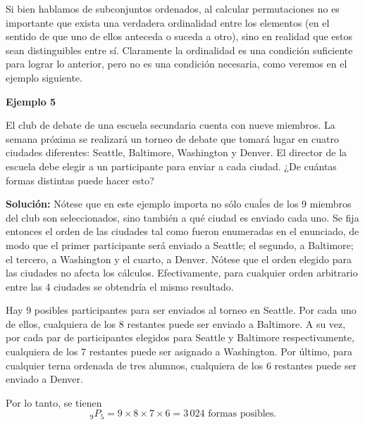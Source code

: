 \documentclass[
  letterpaper,
  DIV=11,
  numbers=noendperiod]{scrreprt}
\begin{document}
\begin{tcolorbox}[enhanced jigsaw, opacitybacktitle=0.6, breakable, toptitle=1mm, toprule=.15mm, colback=white, coltitle=black, leftrule=.75mm, colframe=quarto-callout-warning-color-frame, left=2mm, opacityback=0, bottomrule=.15mm, arc=.35mm, colbacktitle=quarto-callout-warning-color!10!white, bottomtitle=1mm, titlerule=0mm, title=\textcolor{quarto-callout-warning-color}{\faExclamationTriangle}\hspace{0.5em}{Advertencia}, rightrule=.15mm]

Si bien hablamos de subconjuntos ordenados, al calcular permutaciones no
es importante que exista una verdadera ordinalidad entre los elementos
(en el sentido de que uno de ellos anteceda o suceda a otro), sino en
realidad que estos sean distinguibles entre sí. Claramente la
ordinalidad es una condición suficiente para lograr lo anterior, pero no
es una condición necesaria, como veremos en el ejemplo siguiente.

\end{tcolorbox}

\begin{examplebox}

\begin{center}
\textbf{Ejemplo 5}

\end{center}

El club de debate de una escuela secundaria cuenta con nueve miembros.
La semana próxima se realizará un torneo de debate que tomará lugar en
cuatro ciudades diferentes: Seattle, Baltimore, Washington y Denver. El
director de la escuela debe elegir a un participante para enviar a cada
ciudad. ¿De cuántas formas distintas puede hacer esto?

\textbf{Solución:} Nótese que en este ejemplo importa no sólo cuaĺes de
los 9 miembros del club son seleccionados, sino también a qué ciudad es
enviado cada uno. Se fija entonces el orden de las ciudades tal como
fueron enumeradas en el enunciado, de modo que el primer participante
será enviado a Seattle; el segundo, a Baltimore; el tercero, a
Washington y el cuarto, a Denver. Nótese que el orden elegido para las
ciudades no afecta los cálculos. Efectivamente, para cualquier orden
arbitrario entre las 4 ciudades se obtendría el mismo resultado.

Hay 9 posibles participantes para ser enviados al torneo en Seattle. Por
cada uno de ellos, cualquiera de los 8 restantes puede ser enviado a
Baltimore. A su vez, por cada par de participantes elegidos para Seattle
y Baltimore respectivamente, cualquiera de los 7 restantes puede ser
asignado a Washington. Por último, para cualquier terna ordenada de tres
alumnos, cualquiera de los 6 restantes puede ser enviado a Denver.

Por lo tanto, se tienen
\[_9P_5 = 9 \times 8 \times 7 \times 6 = 3\,024 \text{ formas posibles.}\]

\end{examplebox}
\end{document}
